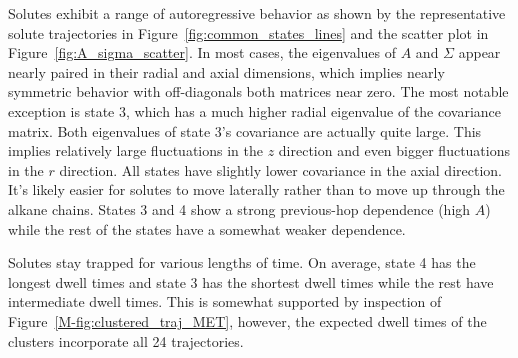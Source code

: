 \documentclass{article}
\begin{document}
  Solutes exhibit a range of autoregressive behavior as shown by the representative 
  solute trajectories in Figure~\ref{fig:common_states_lines} and the scatter
  plot in Figure~\ref{fig:A_sigma_scatter}. In most cases, the eigenvalues of $A$ and
  $\Sigma$ appear nearly paired in their radial and axial dimensions, which implies 
  nearly symmetric behavior with off-diagonals both matrices near zero. The most 
  notable exception is state 3, which has a much higher radial eigenvalue of the 
  covariance matrix. Both eigenvalues of state 3's covariance are actually quite
  large. This implies relatively large fluctuations in the $z$ direction and even
  bigger fluctuations in the $r$ direction. All states have slightly lower covariance
  in the axial direction. It's likely easier for solutes to move laterally rather 
  than to move up through the alkane chains. States 3 and 4 show a strong previous-hop
  dependence (high $A$) while the rest of the states have a somewhat weaker dependence.

  Solutes stay trapped for various lengths of time. On average, state 4 has the longest 
  dwell times and state 3 has the shortest dwell times while the rest have intermediate
  dwell times. This is somewhat supported by inspection of Figure~\ref{M-fig:clustered_traj_MET},
  however, the expected dwell times of the clusters incorporate all 24 trajectories.
  
\end{document}
